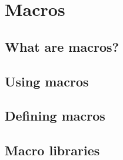 \section{Macros}
\label{macros}

\subsection{What are macros?}
\label{macros.whatAre}

\subsection{Using macros}
\label{macros.using}

\subsection{Defining macros}
\label{macros.defining}

\subsection{Macro libraries}
\label{macros.libraries}